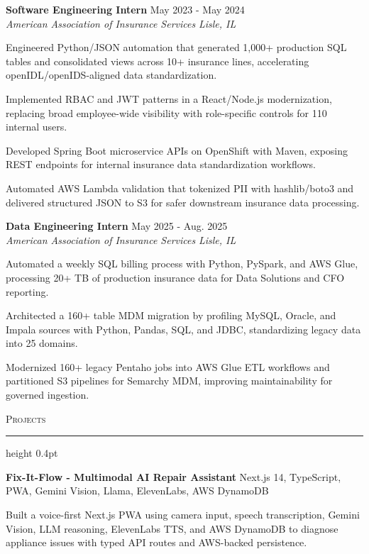 \documentclass[letterpaper,11pt]{article}
\newcommand{\resumesection}[1]{%
  \par\vspace{2pt}%
  {\large\scshape #1}\par\vspace{2pt}%
  \hrule height 0.4pt\vspace{2pt}%
}
\newcommand{\resumeSubheading}[4]{
  \textbf{#1} \hfill #2\\
  \textit{#3} \hfill \textit{#4}
}
\newcommand{\projectHeading}[2]{
  \textbf{#1} \hfill #2
}
\begin{document}
\resumeSubheading
{Software Engineering Intern}{May 2023 - May 2024}
{American Association of Insurance Services}{Lisle, IL}
\begin{tightitemize}
  \item Engineered Python/JSON automation that generated 1,000+ production SQL tables and consolidated views across 10+ insurance lines, accelerating openIDL/openIDS-aligned data standardization.
  \item Implemented RBAC and JWT patterns in a React/Node.js modernization, replacing broad employee-wide visibility with role-specific controls for 110 internal users.
  \item Developed Spring Boot microservice APIs on OpenShift with Maven, exposing REST endpoints for internal insurance data standardization workflows.
  \item Automated AWS Lambda validation that tokenized PII with hashlib/boto3 and delivered structured JSON to S3 for safer downstream insurance data processing.
\end{tightitemize}

\resumeSubheading
{Data Engineering Intern}{May 2025 - Aug. 2025}
{American Association of Insurance Services}{Lisle, IL}
\begin{tightitemize}
  \item Automated a weekly SQL billing process with Python, PySpark, and AWS Glue, processing 20+ TB of production insurance data for Data Solutions and CFO reporting.
  \item Architected a 160+ table MDM migration by profiling MySQL, Oracle, and Impala sources with Python, Pandas, SQL, and JDBC, standardizing legacy data into 25 domains.
  \item Modernized 160+ legacy Pentaho jobs into AWS Glue ETL workflows and partitioned S3 pipelines for Semarchy MDM, improving maintainability for governed ingestion.
\end{tightitemize}

\resumesection{Projects}
\projectHeading{Fix-It-Flow - Multimodal AI Repair Assistant}{Next.js 14, TypeScript, PWA, Gemini Vision, Llama, ElevenLabs, AWS DynamoDB}
\begin{tightitemize}
  \item Built a voice-first Next.js PWA using camera input, speech transcription, Gemini Vision, LLM reasoning, ElevenLabs TTS, and AWS DynamoDB to diagnose appliance issues with typed API routes and AWS-backed persistence.
\end{tightitemize}
\end{document}
